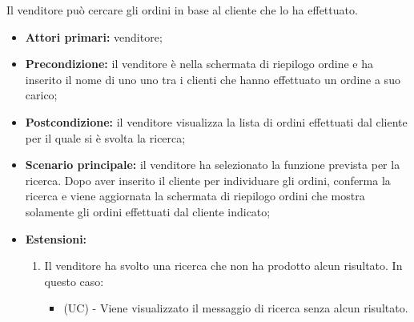 Il venditore può cercare gli ordini in base al cliente che lo ha effettuato.
\begin{itemize}
	\item \textbf{Attori primari:} venditore;
	\item \textbf{Precondizione:} il venditore è nella schermata di riepilogo ordine e ha inserito il nome di uno uno tra i clienti che hanno effettuato un ordine a suo carico;
	\item \textbf{Postcondizione:} il venditore visualizza la lista di ordini effettuati dal cliente per il quale si è svolta la ricerca;
	\item \textbf{Scenario principale:} il venditore ha selezionato la funzione prevista per la ricerca. Dopo aver inserito il cliente per individuare gli ordini, conferma la ricerca e viene aggiornata la schermata di riepilogo ordini che mostra solamente gli ordini effettuati dal cliente indicato;
	\item \textbf{Estensioni:}
	\begin{enumerate}[label=\lett]
		\item Il venditore ha svolto una ricerca che non ha prodotto alcun risultato. In questo caso:
		\begin{itemize}
			\item (UC) - Viene visualizzato il messaggio di ricerca senza alcun risultato.
		\end{itemize}
	\end{enumerate}
\end{itemize}



